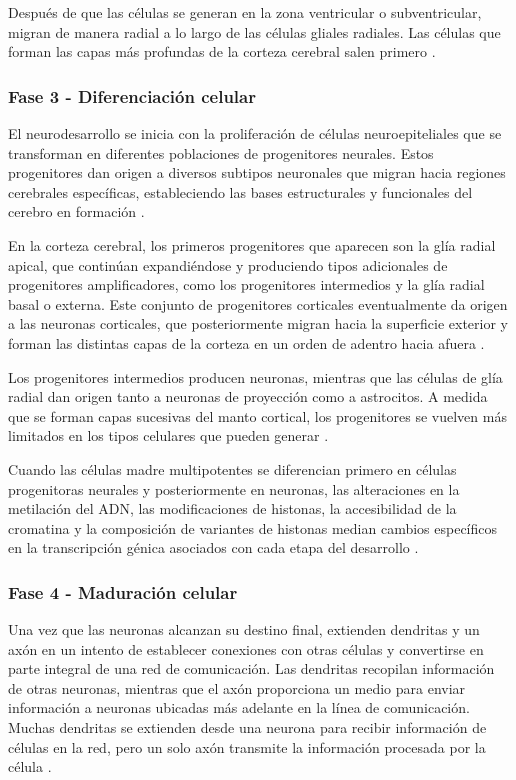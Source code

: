 Después de que las células se generan en la zona ventricular o subventricular,
migran de manera radial a lo largo de las células gliales radiales. Las células
que forman las capas más profundas de la corteza cerebral salen primero
\cite{Polin124}.

\subsubsection{Fase 3 - Diferenciación celular}
El neurodesarrollo se inicia con la proliferación de células neuroepiteliales
que se transforman en diferentes poblaciones de progenitores neurales. Estos
progenitores dan origen a diversos subtipos neuronales que migran hacia
regiones cerebrales específicas, estableciendo las bases estructurales y
funcionales del cerebro en formación \cite{Lindhout2024}.

En la corteza cerebral, los primeros progenitores que aparecen son la glía
radial apical, que continúan expandiéndose y produciendo tipos adicionales de
progenitores amplificadores, como los progenitores intermedios y la glía radial
basal o externa. Este conjunto de progenitores corticales eventualmente da
origen a las neuronas corticales, que posteriormente migran hacia la superficie
exterior y forman las distintas capas de la corteza en un orden de adentro
hacia afuera \cite{Lindhout2024}.

Los progenitores intermedios producen neuronas, mientras que las células de
glía radial dan origen tanto a neuronas de proyección como a astrocitos. A
medida que se forman capas sucesivas del manto cortical, los progenitores se
vuelven más limitados en los tipos celulares que pueden generar
\cite{Lindhout2024}.

Cuando las células madre multipotentes se diferencian primero en células
progenitoras neurales y posteriormente en neuronas, las alteraciones en la
metilación del ADN, las modificaciones de histonas, la accesibilidad de la
cromatina y la composición de variantes de histonas median cambios específicos
en la transcripción génica asociados con cada etapa del desarrollo
\cite{Lindhout2024}.

\subsubsection{Fase 4 - Maduración celular}
Una vez que las neuronas alcanzan su destino final, extienden dendritas y un
axón en un intento de establecer conexiones con otras células y convertirse en
parte integral de una red de comunicación. Las dendritas recopilan información
de otras neuronas, mientras que el axón proporciona un medio para enviar
información a neuronas ubicadas más adelante en la línea de comunicación.
Muchas dendritas se extienden desde una neurona para recibir información de
células en la red, pero un solo axón transmite la información procesada por la
célula \cite{Gibb2018}.

